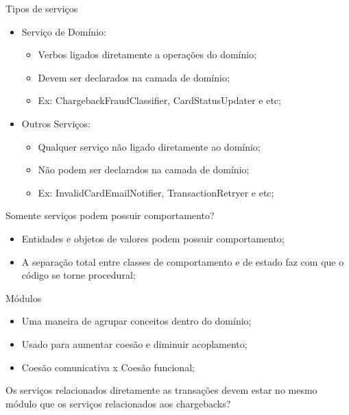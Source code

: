 \documentclass[aspectratio=169]{beamer}
\begin{document}
\begin{frame}{Tipos de serviços}	
	\begin{multicols}{2}		
		\begin{itemize}	
			\item Serviço de Domínio:
			\begin{itemize}	
				\item Verbos ligados diretamente a operações do domínio;
				\item Devem ser declarados na camada de domínio;
				\item Ex: ChargebackFraudClassifier, CardStatusUpdater e etc; 
			\end{itemize}
		\end{itemize}
		\begin{itemize}	
			\item Outros Serviços:
			\begin{itemize}	
				\item Qualquer serviço não ligado diretamente ao domínio;
				\item Não podem ser declarados na camada de domínio;
				\item Ex: InvalidCardEmailNotifier, TransactionRetryer e etc;
			\end{itemize}
		\end{itemize}
	\end{multicols}
\end{frame}

\begin{frame}{Somente serviços podem possuir comportamento?}	
	\begin{itemize}	
		\item Entidades e objetos de valores podem possuir comportamento;
		\item A separação total entre classes de comportamento e de estado faz com que o código se torne procedural;
	\end{itemize}
\end{frame}

\begin{frame}{Módulos}	
	\begin{itemize}	
		\item Uma maneira de agrupar conceitos dentro do domínio;
		\item Usado para aumentar coesão e diminuir acoplamento;
		\item Coesão comunicativa x Coesão funcional;
	\end{itemize}

	Os serviços relacionados diretamente as transações devem estar no mesmo módulo que os serviços relacionados aos chargebacks?
\end{frame}
\end{document}
